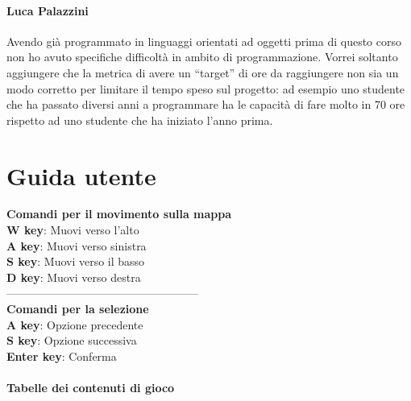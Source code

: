 \documentclass[a4paper,12pt]{report}
\begin{document}
\subsubsection{Luca Palazzini}
Avendo già programmato in linguaggi orientati ad oggetti prima di questo corso non ho avuto specifiche difficoltà in ambito di programmazione. 
%
Vorrei soltanto aggiungere che la metrica di avere un “target” di ore da raggiungere non sia un modo corretto per limitare il tempo speso sul progetto: ad esempio uno studente che ha passato diversi anni a programmare ha le capacità di fare molto in 70 ore rispetto ad uno studente che ha iniziato l’anno prima.
\appendix
\chapter{Guida utente}
\textbf{Comandi per il movimento sulla mappa} \\
\textbf{W key}: Muovi verso l'alto \\
\textbf{A key}: Muovi verso sinistra \\
\textbf{S key}: Muovi verso il basso \\
\textbf{D key}: Muovi verso destra \\
--------------------------------------------------- \\
\textbf{Comandi per la selezione} \\
\textbf{A key}: Opzione precedente \\
\textbf{S key}: Opzione successiva \\
\textbf{Enter key}: Conferma \\ \\
\textbf{Tabelle dei contenuti di gioco} \\
\tiny
\end{document}
